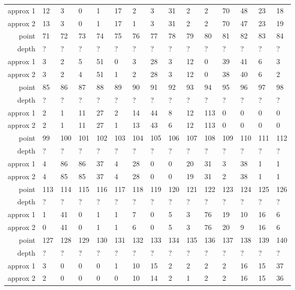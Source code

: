 \begin{center}
\begin{supertabular}{|r|l l l l l l l l l l l l l l|}
approx 1 & 12 & 3 & 0 & 1 & 17 & 2 & 3 & 31 & 2 & 2 & 70 & 48 & 23 & 18 \\
approx 2 & 13 & 3 & 0 & 1 & 17 & 1 & 3 & 31 & 2 & 2 & 70 & 47 & 23 & 19 \\
\hline
point & 71 & 72 & 73 & 74 & 75 & 76 & 77 & 78 & 79 & 80 & 81 & 82 & 83 & 84 \\
\hline
depth & ? & ? & ? & ? & ? & ? & ? & ? & ? & ? & ? & ? & ? & ? \\
approx 1 & 3 & 2 & 5 & 51 & 0 & 3 & 28 & 3 & 12 & 0 & 39 & 41 & 6 & 3 \\
approx 2 & 3 & 2 & 4 & 51 & 1 & 2 & 28 & 3 & 12 & 0 & 38 & 40 & 6 & 2 \\
\hline
point & 85 & 86 & 87 & 88 & 89 & 90 & 91 & 92 & 93 & 94 & 95 & 96 & 97 & 98 \\
\hline
depth & ? & ? & ? & ? & ? & ? & ? & ? & ? & ? & ? & ? & ? & ? \\
approx 1 & 2 & 1 & 11 & 27 & 2 & 14 & 44 & 8 & 12 & 113 & 0 & 0 & 0 & 0 \\
approx 2 & 2 & 1 & 11 & 27 & 1 & 13 & 43 & 6 & 12 & 113 & 0 & 0 & 0 & 0 \\
\hline
point & 99 & 100 & 101 & 102 & 103 & 104 & 105 & 106 & 107 & 108 & 109 & 110 & 111 & 112 \\
\hline
depth & ? & ? & ? & ? & ? & ? & ? & ? & ? & ? & ? & ? & ? & ? \\
approx 1 & 4 & 86 & 86 & 37 & 4 & 28 & 0 & 0 & 20 & 31 & 3 & 38 & 1 & 1 \\
approx 2 & 4 & 85 & 85 & 37 & 4 & 28 & 0 & 0 & 19 & 31 & 2 & 38 & 1 & 1 \\
\hline
point & 113 & 114 & 115 & 116 & 117 & 118 & 119 & 120 & 121 & 122 & 123 & 124 & 125 & 126 \\
\hline
depth & ? & ? & ? & ? & ? & ? & ? & ? & ? & ? & ? & ? & ? & ? \\
approx 1 & 1 & 41 & 0 & 1 & 1 & 7 & 0 & 5 & 3 & 76 & 19 & 10 & 16 & 6 \\
approx 2 & 0 & 41 & 0 & 1 & 1 & 6 & 0 & 5 & 3 & 76 & 20 & 9 & 16 & 6 \\
\hline
point & 127 & 128 & 129 & 130 & 131 & 132 & 133 & 134 & 135 & 136 & 137 & 138 & 139 & 140 \\
\hline
depth & ? & ? & ? & ? & ? & ? & ? & ? & ? & ? & ? & ? & ? & ? \\
approx 1 & 3 & 0 & 0 & 0 & 1 & 10 & 15 & 2 & 2 & 2 & 2 & 16 & 15 & 37 \\
approx 2 & 2 & 0 & 0 & 0 & 0 & 10 & 14 & 2 & 1 & 2 & 2 & 16 & 15 & 36 \\
\hline

\end{supertabular}
\end{center}
